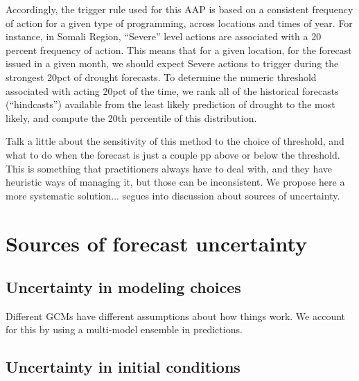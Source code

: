 \documentclass{ametsocV5}
\begin{document}
Accordingly, the trigger rule used for this AAP is based on a consistent frequency of action for a given type of programming, across locations and times of year. For instance, in Somali Region, “Severe” level actions are associated with a 20 percent frequency of action. This means that for a given location, for the forecast issued in a given month, we should expect Severe actions to trigger during the strongest 20pct of drought forecasts. To determine the numeric threshold associated with acting 20pct of the time, we rank all of the historical forecasts (“hindcasts”) available from the least likely prediction of drought to the most likely, and compute the 20th percentile of this distribution.

Talk a little about the sensitivity of this method to the choice of threshold, and what to do when the forecast is just a couple pp above or below the threshold. This is something that practitioners always have to deal with, and they have heuristic ways of managing it, but those can be inconsistent. We propose here a more systematic solution... segues into discussion about sources of uncertainty.

\section{Sources of forecast uncertainty}




\subsection{Uncertainty in modeling choices}

Different GCMs have different assumptions about how things work. We account for this by using a multi-model ensemble in predictions.

\subsection{Uncertainty in initial conditions}
\end{document}
